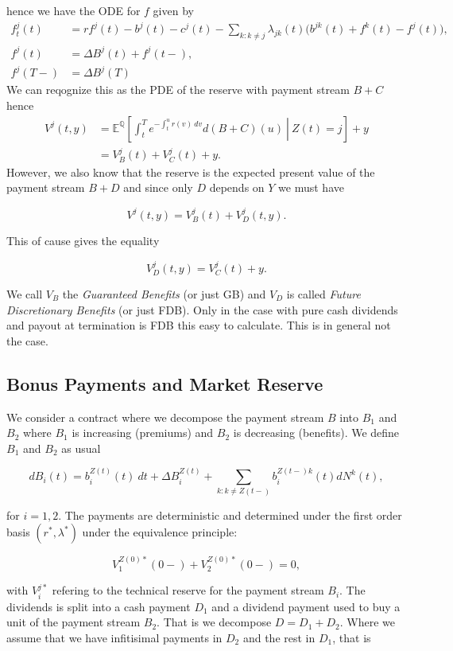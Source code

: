 \documentclass[a4paper,10pt,openany]{book}
\begin{document}
hence we have the ODE for \(f\) given by
\begin{align*}
f_t^j(t)&=rf^j(t)-b^j(t)-c^j(t)-\sum_{k:k\ne j}\lambda_{jk}(t)\Big(b^{jk}(t)+f^k(t)-f^j(t)\Big),\\
f^j(t)&=\Delta B^j(t)+f^j(t-),\\
f^j(T-)&=\Delta B^j(T)
\end{align*}
We can reqognize this as the PDE of the reserve with payment stream \(B+C\) hence
\begin{align*}
V^j(t,y)&=\mathbb E^{\mathbb Q}\left[\left.\int_t^Te^{-\int_t^u r(v)\ dv}d(B+C)(u)\ \right\vert\ Z(t)=j\right]+y\\
&=V_B^j(t)+V_C^j(t)+y.
\end{align*}
However, we also know that the reserve is the expected present value of the payment stream \(B+D\) and since only \(D\) depends on \(Y\) we must have

\[
V^j(t,y)=V_B^j(t)+V_D^j(t,y).
\]

This of cause gives the equality

\[
V_D^j(t,y)=V_C^j(t)+y.
\]

We call \(V_B\) the \emph{Guaranteed Benefits} (or just GB) and \(V_D\) is called \emph{Future Discretionary Benefits} (or just FDB). Only in the case with pure cash dividends and payout at termination is FDB this easy to calculate. This is in general not the case.

\hypertarget{bonus-payments-and-market-reserve}{%
\subsection{Bonus Payments and Market Reserve}\label{bonus-payments-and-market-reserve}}

We consider a contract where we decompose the payment stream \(B\) into \(B_1\) and \(B_2\) where \(B_1\) is increasing (premiums) and \(B_2\) is decreasing (benefits). We define \(B_1\) and \(B_2\) as usual

\[
dB_i(t)=b_i^{Z(t)}(t)\ dt + \Delta B_i^{Z(t)}+\sum_{k:k\ne Z(t-)}b_i^{Z(t-)k}(t)dN^k(t),
\]

for \(i=1,2\). The payments are deterministic and determined under the first order basis \((r^*,\lambda^*)\) under the equivalence principle:

\[
V^{Z(0)*}_1(0-)+V_2^{Z(0)*}(0-)=0,
\]

with \(V_i^{j*}\) refering to the technical reserve for the payment stream \(B_i\). The dividends is split into a cash payment \(D_1\) and a dividend payment used to buy a unit of the payment stream \(B_2\). That is we decompose \(D=D_1+D_2\). Where we assume that we have infitisimal payments in \(D_2\) and the rest in \(D_1\), that is
\end{document}
